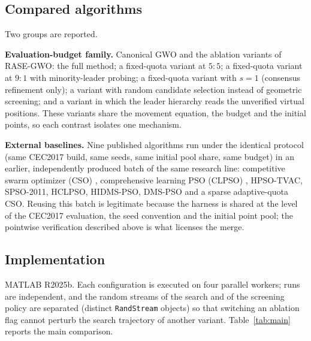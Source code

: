 \subsection{Compared algorithms}

Two groups are reported.

\textbf{Evaluation-budget family.} Canonical GWO and the ablation variants of
RASE-GWO: the full method; a fixed-quota variant at $5{:}5$; a fixed-quota
variant at $9{:}1$ with minority-leader probing; a fixed-quota variant with
$s=1$ (consensus refinement only); a variant with random candidate selection
instead of geometric screening; and a variant in which the leader hierarchy
reads the unverified virtual positions. These variants share the movement
equation, the budget and the initial points, so each contrast isolates one
mechanism.

\textbf{External baselines.} Nine published algorithms run under the identical
protocol (same CEC2017 build, same seeds, same initial pool share, same budget)
in an earlier, independently produced batch of the same research line:
competitive swarm optimizer (CSO) \cite{cheng2015cso}, comprehensive learning
PSO (CLPSO) \cite{liang2006clpso}, HPSO-TVAC, SPSO-2011, HCLPSO, HIDMS-PSO,
DMS-PSO and a sparse adaptive-quota CSO. Reusing this batch is legitimate
because the harness is shared at the level of the CEC2017 evaluation, the seed
convention and the initial point pool; the pointwise verification described
above is what licenses the merge. 

\subsection{Implementation}

MATLAB R2025b. Each configuration is executed on four parallel workers; runs
are independent, and the random streams of the search and of the screening
policy are separated (distinct \texttt{RandStream} objects) so that switching
an ablation flag cannot perturb the search trajectory of another variant.
Table~\ref{tab:main} reports the main comparison.



